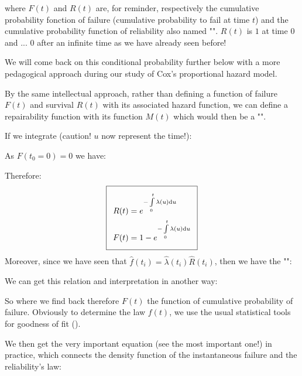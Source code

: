 	where $F(t)$ and $R(t)$ are, for reminder, respectively the cumulative probability fonction of failure (cumulative probability to fail at time $t$) and the cumulative probability function of reliability also named "". $R (t)$ is $1$ at time $0$ and ... $0$ after an infinite time as we have already seen before!
	
	We will come back on this conditional probability further below with a more pedagogical approach during our study of Cox's proportional hazard model.
	
	\begin{tcolorbox}[title=Remark,colframe=black,arc=10pt]
	By the same intellectual approach, rather than defining a function of failure $F(t)$ and survival $R(t)$ with its associated hazard function, we can define a repairability function with its function $M(t)$ which would then be a "".
	\end{tcolorbox}
	If we integrate (caution! $u$ now represent the time!):
	
	As $F(t_0=0)=0$ we have:
	
	Therefore:
	\begin{equation}
  \addtolength{\fboxsep}{5pt}
   \boxed{
   \begin{gathered}
   		\begin{aligned}
		R(t)&=e^{-\int\limits_0^t\lambda(u)\mathrm{d}u}\\
		F(t)&= 1 - e^{-\int\limits_0^t\lambda(u)\mathrm{d}u}
   		\end{aligned}
   \end{gathered}
   }
	\end{equation}
		Moreover, since we have seen that $\hat{f}(t_i)=\hat{\lambda}(t_i)\hat{R}(t_i)$, then we have the "":
	
	We can get this relation and interpretation in another way:
	
	So where we find back therefore $F (t)$ the function of cumulative probability of failure. Obviously to determine the law $f (t)$, we use the usual statistical tools for goodness of fit ().
	
	We then get the very important equation (see the most important one!) in practice, which connects the density function of the instantaneous failure and the reliability's law:
	

